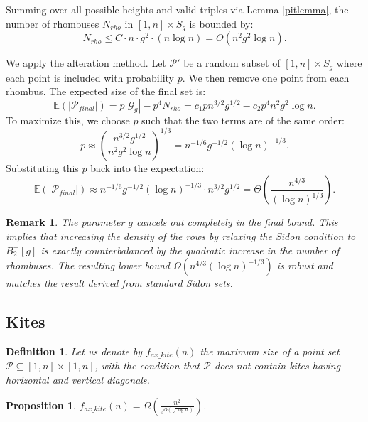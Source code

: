 \documentclass[11pt]{article}
\theoremstyle{plain}
\newtheorem{prop}[theorem]{\bf Proposition}
\newtheorem{remark}[theorem]{\bf Remark}
\newtheorem{defi}[theorem]{\bf Definition}
\newcommand\cP{{\mathcal P}}
\begin{document}
	Summing over all possible heights and valid triples via Lemma \ref{pitlemma}, the number of rhombuses $N_{rho}$ in $[1, n] \times S_g$ is bounded by:
	\begin{equation}
		N_{rho} \le C \cdot n \cdot g^2 \cdot (n \log n) = O(n^2 g^2 \log n).
	\end{equation}
	
	We apply the alteration method. Let $\mathcal{P}'$ be a random subset of $[1, n] \times S_g$ where each point is included with probability $p$. We then remove one point from each rhombus. The expected size of the final set is:
	\begin{equation}
		\mathbb{E}(|\mathcal{P}_{final}|) = p |\mathcal{G}_g| - p^4 N_{rho} = c_1 p n^{3/2}g^{1/2} - c_2 p^4 n^2 g^2 \log n.
	\end{equation}
	To maximize this, we choose $p$ such that the two terms are of the same order:
	\[
	p \approx \left( \frac{n^{3/2}g^{1/2}}{n^2 g^2 \log n} \right)^{1/3} = n^{-1/6} g^{-1/2} (\log n)^{-1/3}.
	\]
	Substituting this $p$ back into the expectation:
	\begin{equation}
		\mathbb{E}(|\mathcal{P}_{final}|) \approx n^{-1/6} g^{-1/2} (\log n)^{-1/3} \cdot n^{3/2} g^{1/2} = \Theta\left( \frac{n^{4/3}}{(\log n)^{1/3}} \right).
	\end{equation}
	\begin{remark}
		The parameter $g$ cancels out completely in the final bound. This implies that increasing the density of the rows by relaxing the Sidon condition to $B_2^-[g]$ is exactly counterbalanced by the quadratic increase in the number of rhombuses. The resulting lower bound $\Omega(n^{4/3}(\log n)^{-1/3})$ is robust and matches the result derived from standard Sidon sets.
	\end{remark}
	
	
	\subsection{Kites}
	
	
	\begin{defi}
		Let us denote by $f_{ax\_kite}(n)$ the maximum size of a point set $\cP\subseteq [1,n]\times [1,n]$, with the condition that $\cP$ does not contain kites having horizontal and vertical diagonals. 
	\end{defi}
	
	\begin{prop}\label{apk1}
		$f_{ax\_kite}(n)=\Omega\left(\frac{n^2}{e^{O(\sqrt{\log{n}})}}\right)$.
	\end{prop}
	
\end{document}
